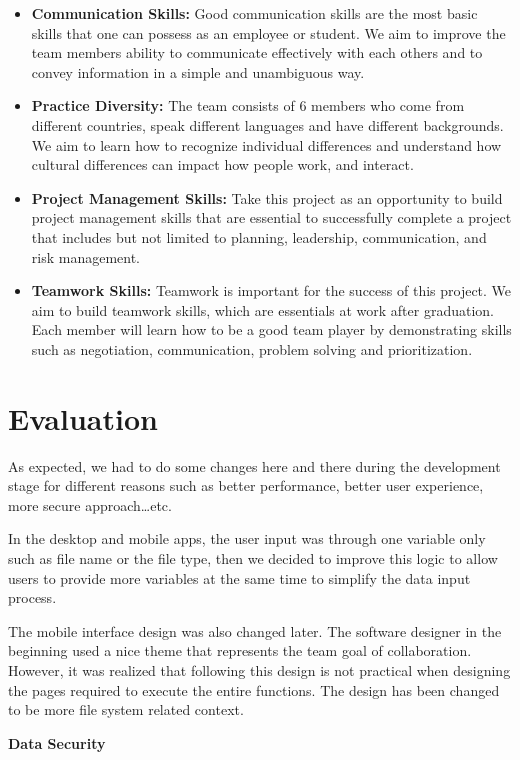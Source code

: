 \documentclass{article}
\begin{document}
\begin{itemize}
\item \textbf{Communication Skills:} Good communication skills are the most basic skills that one can possess as an employee or student. We aim to improve the team members ability to communicate effectively with each others and to convey information in a simple and unambiguous way.
\item \textbf{Practice Diversity:} The team consists of 6 members who come from different countries, speak different languages and have different backgrounds. We aim to learn how to recognize individual differences and understand how cultural differences can impact how people work, and interact.
\item \textbf{Project Management Skills:} Take this project as an opportunity to build project management skills that are essential to successfully complete a project that includes but not limited to planning, leadership, communication, and risk management.
\item \textbf{Teamwork Skills:} Teamwork is important for the success of this project. We aim to build teamwork skills, which are essentials at work after graduation. Each member will learn how to be a good team player by demonstrating skills such as negotiation, communication, problem solving and prioritization.
\end{itemize}

\section{Evaluation}
As expected, we had to do some changes here and there during the development stage for different reasons such as better performance, better user experience, more secure approach…etc.

In the desktop and mobile apps, the user input was through one variable only such as file name or the file type, then we decided to improve this logic to allow users to provide more variables at the same time to simplify the data input process.

The mobile interface design was also changed later. The software designer in the beginning used a nice theme that represents the team goal of collaboration. However, it was realized that following this design is not practical when designing the pages required to execute the entire functions. The design has been changed to be more file system related context.

\textbf{Data Security}
\end{document}
